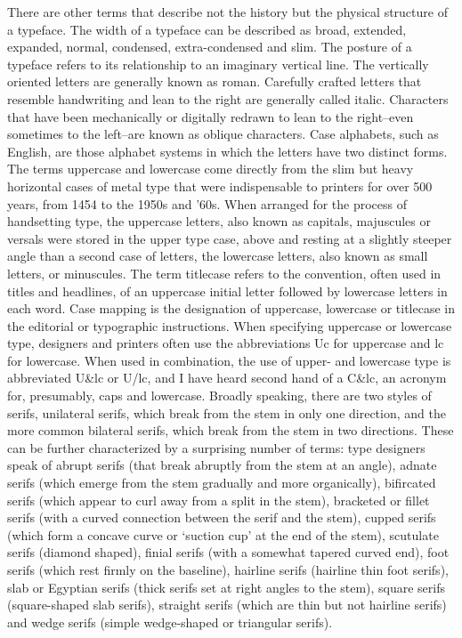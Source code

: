 \documentclass[12pt,a4paper,twocolumn]{book} %
\begin{document}
There are other terms that describe not the history but the physical structure of a typeface. The width of a typeface can be described as broad, extended, expanded, normal, condensed, extra-condensed and slim. The posture of a typeface refers to its relationship to an imaginary vertical line. The vertically oriented letters are generally known as roman. Carefully crafted letters that resemble handwriting and lean to the right are generally called italic. Characters that have been mechanically or digitally redrawn to lean to the right–even sometimes to the left–are known as oblique characters.
Case alphabets, such as English, are those alphabet systems in which the letters have two distinct forms. The terms uppercase and lowercase come directly from the slim but heavy horizontal cases of metal type that were indispensable to printers for over 500 years, from 1454 to the 1950s and ’60s. When arranged for the process of handsetting type, the uppercase letters, also known as capitals, majuscules or versals were stored in the upper type case, above and resting at a slightly steeper angle than a second case of letters, the lowercase letters, also known as small letters, or minuscules. The term titlecase refers to the convention, often used in titles and headlines, of an uppercase initial letter followed by lowercase letters in each word.
Case mapping is the designation of uppercase, lowercase or titlecase in the editorial or typographic instructions. When specifying uppercase or lowercase type, designers and printers often use the abbreviations Uc for uppercase and lc for lowercase. When used in combination, the use of upper- and lowercase type is abbreviated U\&lc or U/lc, and I have heard second hand of a C\&lc, an acronym for, presumably, caps and lowercase.
Broadly speaking, there are two styles of serifs, unilateral serifs, which break from the stem in only one direction, and the more common bilateral serifs, which break from the stem in two directions. These can be further characterized by a surprising number of terms: type designers speak of abrupt serifs (that break abruptly from the stem at an angle), adnate serifs (which emerge from the stem gradually and more organically), bifircated serifs (which appear to curl away from a split in the stem), bracketed or fillet serifs (with a curved connection between the serif and the stem), cupped serifs (which form a concave curve or ‘suction cup’ at the end of the stem), scutulate serifs (diamond shaped), finial serifs (with a somewhat tapered curved end), foot serifs (which rest firmly on the baseline), hairline serifs (hairline thin foot serifs), slab or Egyptian serifs (thick serifs set at right angles to the stem), square serifs (square-shaped slab serifs), straight serifs (which are thin but not hairline serifs) and wedge serifs (simple wedge-shaped or triangular serifs).
\end{document}
